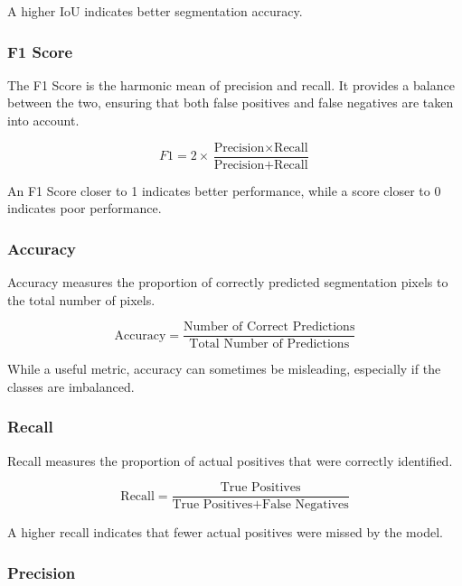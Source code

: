 \documentclass[11pt, a4paper,oneside,chapterprefix=false]{scrbook}
\begin{document}
A higher IoU indicates better segmentation accuracy.

\subsubsection{F1 Score}

The F1 Score is the harmonic mean of precision and recall. It provides a balance between the two, ensuring that both false positives and false negatives are taken into account.

\begin{equation}
	F1 = 2 \times \frac{\text{Precision} \times \text{Recall}}{\text{Precision} + \text{Recall}}
\end{equation}

An F1 Score closer to 1 indicates better performance, while a score closer to 0 indicates poor performance.

\subsubsection{Accuracy}

Accuracy measures the proportion of correctly predicted segmentation pixels to the total number of pixels.

\begin{equation}
	\text{Accuracy} = \frac{\text{Number of Correct Predictions}}{\text{Total Number of Predictions}}
\end{equation}

While a useful metric, accuracy can sometimes be misleading, especially if the classes are imbalanced.

\subsubsection{Recall}

Recall measures the proportion of actual positives that were correctly identified.

\begin{equation}
	\text{Recall} = \frac{\text{True Positives}}{\text{True Positives} + \text{False Negatives}}
\end{equation}

A higher recall indicates that fewer actual positives were missed by the model.

\subsubsection{Precision}
\end{document}
